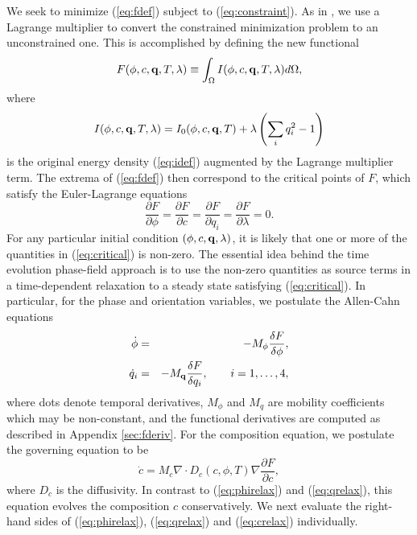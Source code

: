 We seek to minimize (\ref{eq:fdef}) subject to (\ref{eq:constraint}).
As in \cite{0295-5075-71-1-131}, we use a Lagrange multiplier to
convert the constrained minimization problem to an unconstrained one.
This is accomplished by defining the new functional
%
\begin{equation}
  F(\phi,c,{\bf q},T,\lambda) \equiv \int_{\Omega} I(\phi,c,{\bf
    q},T,\lambda) d\Omega,
\label{eq:ftildedef}
\end{equation}
%
where
%
\begin{equation}
  I(\phi,c,{\bf q},T,\lambda) = I_0(\phi,c,{\bf q},T) +
    \lambda \left ( \sum_i q_i^2 - 1 \right )
\label{eq:integrand}
\end{equation}
%
is the original energy density (\ref{eq:idef}) augmented by the
Lagrange multiplier term.  The extrema of (\ref{eq:fdef}) then
correspond to the critical points of $F$, which satisfy the
Euler-Lagrange equations
%
\begin{equation}
  \frac{\partial F}{\partial \phi} = \frac{\partial
    F}{\partial c} = \frac{\partial F}{\partial
    q_i} = \frac{\partial F}{\partial \lambda} = 0.
\label{eq:critical}
\end{equation}
%
For any particular initial condition $(\phi,c,{\bf q},\lambda)$, it is
likely that one or more of the quantities in (\ref{eq:critical}) is
non-zero.  The essential idea behind the time evolution phase-field
approach is to use the non-zero quantities as source terms in a
time-dependent relaxation to a steady state satisfying
(\ref{eq:critical}).  In particular, for the phase and orientation
variables, we postulate the Allen-Cahn equations \cite{AllenCahn79}
%
\begin{eqnarray}
  \dot{\phi} &=& - M_{\phi} \frac{\delta
    F}{\delta \phi} ,
\label{eq:phirelax} \\
  \dot{q}_i &=& - M_{\bf q} \frac{\delta
    F}{\delta q_i} , \hspace{2em} i=1,\ldots,4,
\label{eq:qrelax}
\end{eqnarray}
%
where dots denote temporal derivatives, $M_{\phi}$ and $M_q$ are
mobility coefficients which may be non-constant, and the functional
derivatives are computed as described in Appendix \ref{sec:fderiv}.
For the composition equation, we postulate the governing
equation to be \cite{PhysRevA.45.7424}
%
\begin{equation}
  \dot{c} = M_c \nabla \cdot D_c(c,\phi,T) \nabla
  \frac{\partial F}{\partial c},
\label{eq:crelax}
\end{equation}
%
where $D_c$ is the diffusivity. In
contrast to (\ref{eq:phirelax}) and (\ref{eq:qrelax}), this equation
evolves the composition $c$ conservatively.  We next evaluate the
right-hand sides of (\ref{eq:phirelax}), (\ref{eq:qrelax}) and
(\ref{eq:crelax}) individually.

